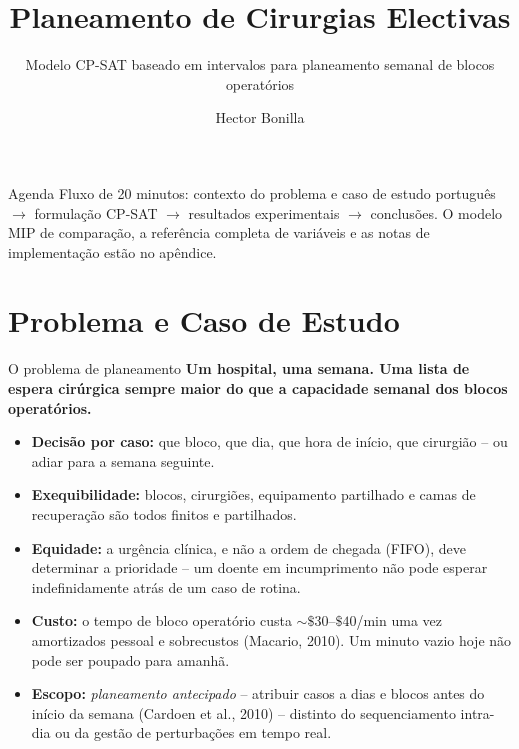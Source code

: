 \documentclass[10pt,aspectratio=169]{beamer}
\title{\large Planeamento de Cirurgias Electivas}
\subtitle{Modelo CP-SAT baseado em intervalos para planeamento semanal de blocos operat\'orios}
\author{Hector Bonilla}
\date{}
\begin{document}
\begin{frame}\titlepage\end{frame}

\begin{frame}{Agenda}
  \hypertarget{toc}{}
  \tableofcontents
  \vspace{0.4em}
  \footnotesize Fluxo de 20 minutos: contexto do problema e caso de
  estudo portugu\^es $\to$ formula\c{c}\~ao CP-SAT $\to$ resultados
  experimentais $\to$ conclus\~oes. O modelo MIP de compara\c{c}\~ao,
  a refer\^encia completa de vari\'aveis e as notas de implementa\c{c}\~ao
  est\~ao no ap\^endice.
\end{frame}

\section{Problema e Caso de Estudo}

\begin{frame}{O problema de planeamento}
  \textbf{Um hospital, uma semana. Uma lista de espera cir\'urgica sempre
  maior do que a capacidade semanal dos blocos operat\'orios.}
  \begin{itemize}\small
    \item \textbf{Decis\~ao por caso:} que bloco, que dia, que hora de
      in\'icio, que cirurgi\~ao -- ou adiar para a semana seguinte.
    \item \textbf{Exequibilidade:} blocos, cirurgi\~oes, equipamento
      partilhado e camas de recupera\c{c}\~ao s\~ao todos finitos e
      partilhados.
    \item \textbf{Equidade:} a urg\^encia cl\'inica, e n\~ao a ordem
      de chegada (FIFO), deve determinar a prioridade -- um doente
      em incumprimento n\~ao pode esperar indefinidamente atr\'as de
      um caso de rotina.
    \item \textbf{Custo:} o tempo de bloco operat\'orio custa
      $\sim\$30$--$\$40$/min uma vez amortizados pessoal e
      sobrecustos (Macario, 2010). Um minuto vazio hoje n\~ao pode
      ser poupado para amanh\~a.
    \item \textbf{Escopo:} \emph{planeamento antecipado} -- atribuir
      casos a dias e blocos antes do in\'icio da semana
      (Cardoen et al., 2010) -- distinto do sequenciamento intra-dia
      ou da gest\~ao de perturba\c{c}\~oes em tempo real.
  \end{itemize}
\end{frame}
\end{document}

